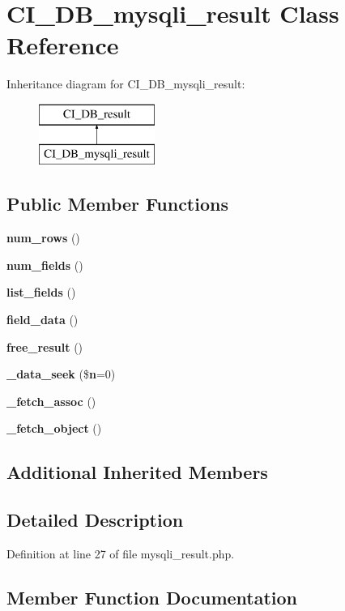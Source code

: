 \section{C\-I\-\_\-\-D\-B\-\_\-mysqli\-\_\-result Class Reference}
\label{class_c_i___d_b__mysqli__result}
Inheritance diagram for C\-I\-\_\-\-D\-B\-\_\-mysqli\-\_\-result\-:\begin{figure}[H]
\begin{center}
\leavevmode
\includegraphics[height=2.000000cm]{class_c_i___d_b__mysqli__result}
\end{center}
\end{figure}
\subsection*{Public Member Functions}
\begin{DoxyCompactItemize}
\item 
{\bf num\-\_\-rows} ()
\item 
{\bf num\-\_\-fields} ()
\item 
{\bf list\-\_\-fields} ()
\item 
{\bf field\-\_\-data} ()
\item 
{\bf free\-\_\-result} ()
\item 
{\bf \-\_\-data\-\_\-seek} (\${\bf n}=0)
\item 
{\bf \-\_\-fetch\-\_\-assoc} ()
\item 
{\bf \-\_\-fetch\-\_\-object} ()
\end{DoxyCompactItemize}
\subsection*{Additional Inherited Members}


\subsection{Detailed Description}


Definition at line 27 of file mysqli\-\_\-result.\-php.



\subsection{Member Function Documentation}
